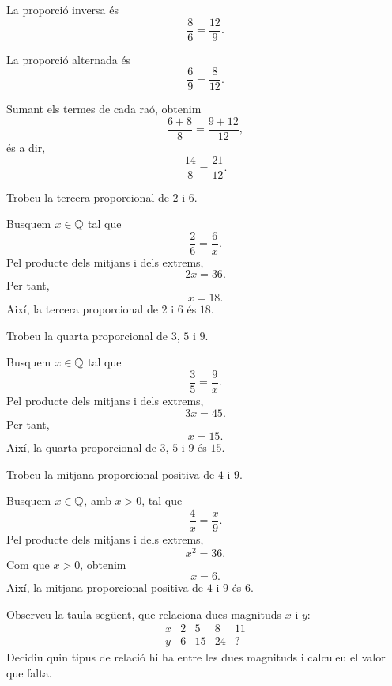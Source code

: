 \begin{solucio}
	La proporció inversa és
	\[
		\frac{8}{6}=\frac{12}{9}.
	\]

	La proporció alternada és
	\[
		\frac{6}{9}=\frac{8}{12}.
	\]

	Sumant els termes de cada raó, obtenim
	\[
		\frac{6+8}{8}=\frac{9+12}{12},
	\]
	és a dir,
	\[
		\frac{14}{8}=\frac{21}{12}.
	\]
\end{solucio}

\begin{exercici}
	Trobeu la tercera proporcional de \(2\) i \(6\).
\end{exercici}

\begin{solucio}
	Busquem \(x\in\mathbb{Q}\) tal que
	\[
		\frac{2}{6}=\frac{6}{x}.
	\]
	Pel producte dels mitjans i dels extrems,
	\[
		2x=36.
	\]
	Per tant,
	\[
		x=18.
	\]
	Així, la tercera proporcional de \(2\) i \(6\) és \(18\).
\end{solucio}

\begin{exercici}
	Trobeu la quarta proporcional de \(3\), \(5\) i \(9\).
\end{exercici}

\begin{solucio}
	Busquem \(x\in\mathbb{Q}\) tal que
	\[
		\frac{3}{5}=\frac{9}{x}.
	\]
	Pel producte dels mitjans i dels extrems,
	\[
		3x=45.
	\]
	Per tant,
	\[
		x=15.
	\]
	Així, la quarta proporcional de \(3\), \(5\) i \(9\) és \(15\).
\end{solucio}

\begin{exercici}
	Trobeu la mitjana proporcional positiva de \(4\) i \(9\).
\end{exercici}

\begin{solucio}
	Busquem \(x\in\mathbb{Q}\), amb \(x>0\), tal que
	\[
		\frac{4}{x}=\frac{x}{9}.
	\]
	Pel producte dels mitjans i dels extrems,
	\[
		x^2=36.
	\]
	Com que \(x>0\), obtenim
	\[
		x=6.
	\]
	Així, la mitjana proporcional positiva de \(4\) i \(9\) és \(6\).
\end{solucio}


\begin{exercici}
	Observeu la taula següent, que relaciona dues magnituds \(x\) i \(y\):
	\[
	\begin{array}{c|cccc}
		x & 2 & 5 & 8 & 11 \\
		\hline
		y & 6 & 15 & 24 & ?
	\end{array}
	\]
	Decidiu quin tipus de relació hi ha entre les dues magnituds i calculeu el valor que falta.
\end{exercici}

